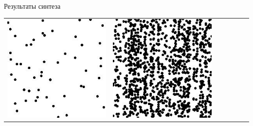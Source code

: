 \documentclass[12pt]{beamer}
\begin{document}
\begin{frame}{Результаты синтеза}
\begin{table}
\begin{center}
\begin{tabular}{p{1.2cm} p{1.2cm} p{1.2cm} p{1.2cm} p{1.2cm} p{1.2cm} p{1.2cm}}
					\includegraphics[width=1\linewidth]{8-results/sand-trend2/left3}
					&
					\includegraphics[width=1\linewidth]{8-results/sand-trend2/right3}
					&

\end{tabular}
\end{center}
\end{table}
\end{frame}
\end{document}
